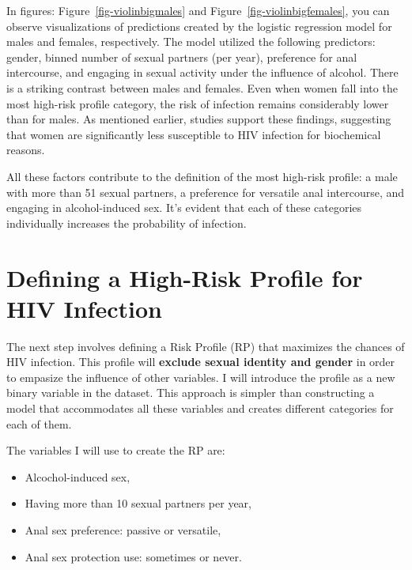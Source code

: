\documentclass[
  12pt,
  letterpaper,
  DIV=11,
  numbers=noendperiod]{scrartcl}
\providecommand{\tightlist}{%
  \setlength{\itemsep}{0pt}\setlength{\parskip}{0pt}}\usepackage{longtable,booktabs,array}
\begin{document}
In figures: Figure~\ref{fig-violinbigmales} and
Figure~\ref{fig-violinbigfemales}, you can observe visualizations of
predictions created by the logistic regression model for males and
females, respectively. The model utilized the following predictors:
gender, binned number of sexual partners (per year), preference for anal
intercourse, and engaging in sexual activity under the influence of
alcohol. There is a striking contrast between males and females. Even
when women fall into the most high-risk profile category, the risk of
infection remains considerably lower than for males. As mentioned
earlier, studies support these findings, suggesting that women are
significantly less susceptible to HIV infection for biochemical reasons.

All these factors contribute to the definition of the most high-risk
profile: a male with more than 51 sexual partners, a preference for
versatile anal intercourse, and engaging in alcohol-induced sex. It's
evident that each of these categories individually increases the
probability of infection.

\hypertarget{defining-a-high-risk-profile-for-hiv-infection}{%
\section{Defining a High-Risk Profile for HIV
Infection}\label{defining-a-high-risk-profile-for-hiv-infection}}

The next step involves defining a Risk Profile (RP) that maximizes the
chances of HIV infection. This profile will
\textbf{ exclude sexual identity and gender} in order to empasize the
influence of other variables. I will introduce the profile as a new
binary variable in the dataset. This approach is simpler than
constructing a model that accommodates all these variables and creates
different categories for each of them.

The variables I will use to create the RP are:

\begin{itemize}
\tightlist
\item
  Alcochol-induced sex,
\item
  Having more than 10 sexual partners per year,
\item
  Anal sex preference: passive or versatile,
\item
  Anal sex protection use: sometimes or never.
\end{itemize}
\end{document}
